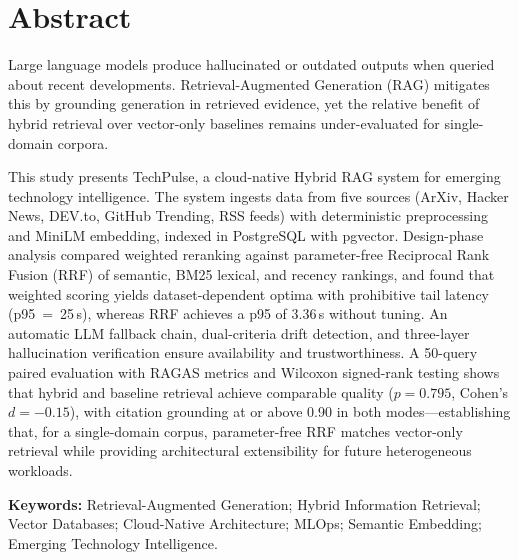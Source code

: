 \chapter*{Abstract}

Large language models produce hallucinated or outdated outputs when queried about recent developments. Retrieval-Augmented Generation (RAG) mitigates this by grounding generation in retrieved evidence, yet the relative benefit of hybrid retrieval over vector-only baselines remains under-evaluated for single-domain corpora.

This study presents TechPulse, a cloud-native Hybrid RAG system for emerging technology intelligence. The system ingests data from five sources (ArXiv, Hacker News, DEV.to, GitHub Trending, RSS feeds) with deterministic preprocessing and MiniLM embedding, indexed in PostgreSQL with pgvector. Design-phase analysis compared weighted reranking against parameter-free Reciprocal Rank Fusion (RRF) of semantic, BM25 lexical, and recency rankings, and found that weighted scoring yields dataset-dependent optima with prohibitive tail latency (p95~=~25\,s), whereas RRF achieves a p95 of 3.36\,s without tuning. An automatic LLM fallback chain, dual-criteria drift detection, and three-layer hallucination verification ensure availability and trustworthiness. A 50-query paired evaluation with RAGAS metrics and Wilcoxon signed-rank testing shows that hybrid and baseline retrieval achieve comparable quality ($p = 0.795$, Cohen's $d = -0.15$), with citation grounding at or above 0.90 in both modes---establishing that, for a single-domain corpus, parameter-free RRF matches vector-only retrieval while providing architectural extensibility for future heterogeneous workloads.

\medskip
\noindent\textbf{Keywords:} Retrieval-Augmented Generation; Hybrid Information Retrieval; Vector Databases; Cloud-Native Architecture; MLOps; Semantic Embedding; Emerging Technology Intelligence.

\newpage\tableofcontents

\newpage
{}
